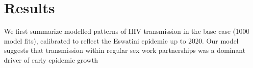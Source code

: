 \section{Results}\label{art.res}
We first summarize modelled patterns of HIV transmission in the base case (1000 model fits),
calibrated to reflect the Eswatini epidemic up to 2020.
Our model suggests that transmission within regular sex work partnerships
was a dominant driver of early epidemic growth
